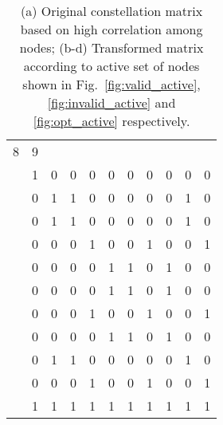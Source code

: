 \documentclass[conference]{IEEEtran}
\begin{document}
\begin{table*}
\begin{subtable}[b]{0.45\linewidth}
\begin{tabular}{c|c|c|c|c|c|c|c|c|c|c|}
	\multicolumn{1}{c}{8} &  \multicolumn{1}{c}{9} \\ \cline{2-11}
	{\color{red} } & {\color{red} 1} & {\color{red} 0} & {\color{red} 0} & {\color{red} 0} & {\color{red} 0} & {\color{red} 0} & {\color{red} 0} & {\color{red} 0} & {\color{red} 0} & {\color{red} 0} \\ \cline{2-11}
	 & 0 & 1 & 1 & 0 & 0 & 0 & 0 & 0 & 1 & 0 \\ \cline{2-11}
	{\color{red} } & {\color{red} 0} & {\color{red} 1} & {\color{red} 1} & {\color{red} 0} & {\color{red} 0} & {\color{red} 0} & {\color{red} 0} & {\color{red} 0} & {\color{red} 1} & {\color{red} 0} \\ \cline{2-11}
	 & 0 & 0 & 0 & 1 & 0 & 0 & 1 & 0 & 0 & 1 \\ \cline{2-11}
	 & 0 & 0 & 0 & 0 & 1 & 1 & 0 & 1 & 0 & 0 \\ \cline{2-11}
	 & 0 & 0 & 0 & 0 & 1 & 1 & 0 & 1 & 0 & 0 \\ \cline{2-11}
	 & 0 & 0 & 0 & 1 & 0 & 0 & 1 & 0 & 0 & 1 \\ \cline{2-11}
	{\color{red} } & {\color{red} 0} & {\color{red} 0} & {\color{red} 0} & {\color{red} 0} & {\color{red} 1} & {\color{red} 1} & {\color{red} 0} & {\color{red} 1} & {\color{red} 0} & {\color{red} 0} \\ \cline{2-11}
	 & 0 & 1 & 1 & 0 & 0 & 0 & 0 & 0 & 1 & 0 \\ \cline{2-11}
	{\color{red} } & {\color{red} 0} & {\color{red} 0} & {\color{red} 0} & {\color{red} 1} & {\color{red} 0} & {\color{red} 0} & {\color{red} 1} & {\color{red} 0} & {\color{red} 0} & {\color{red} 1} \\ \cline{2-11}
	\multicolumn{1}{c}{} & \multicolumn{1}{c}{{\color{blue}1}} & \multicolumn{1}{c}{{\color{blue}1}} & \multicolumn{1}{c}{{\color{blue}1}} & \multicolumn{1}{c}{{\color{blue}1}} & \multicolumn{1}{c}{{\color{blue}1}} & \multicolumn{1}{c}{{\color{blue}1}} & \multicolumn{1}{c}{{\color{blue}1}} & \multicolumn{1}{c}{{\color{blue}1}} & \multicolumn{1}{c}{{\color{blue}1}} & \multicolumn{1}{c}{{\color{blue}1}} \\
	\end{tabular}	
	\caption{}
	\label{table:mat4}
\end{subtable}
\caption{(a) Original constellation matrix based on high correlation among nodes; (b-d) Transformed matrix according to active set of nodes shown in Fig.~\ref{fig:valid_active}, \ref{fig:invalid_active} and \ref{fig:opt_active} respectively.}
\label{table:const_matrix}
\end{table*}
\end{document}
